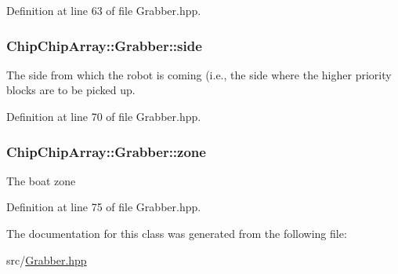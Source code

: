 Definition at line 63 of file Grabber.\+hpp.

\hypertarget{classChipChipArray_1_1Grabber_a8afbaefae7c767c862fd1bf13968539b}{
\subsubsection[{side}]{ Chip\+Chip\+Array\+::\+Grabber\+::side\hspace{0.3cm}{\ttfamily [protected]}}}\label{classChipChipArray_1_1Grabber_a8afbaefae7c767c862fd1bf13968539b}
The side from which the robot is coming (i.\+e., the side where the higher priority blocks are to be picked up. 

Definition at line 70 of file Grabber.\+hpp.

\hypertarget{classChipChipArray_1_1Grabber_ab57efe6e0b6f369b19528285a278d967}{
\subsubsection[{zone}]{ Chip\+Chip\+Array\+::\+Grabber\+::zone\hspace{0.3cm}{\ttfamily [protected]}}}\label{classChipChipArray_1_1Grabber_ab57efe6e0b6f369b19528285a278d967}
The boat zone 

Definition at line 75 of file Grabber.\+hpp.



The documentation for this class was generated from the following file\+:\begin{DoxyCompactItemize}
\item 
src/\hyperlink{Grabber_8hpp}{Grabber.\+hpp}\end{DoxyCompactItemize}
